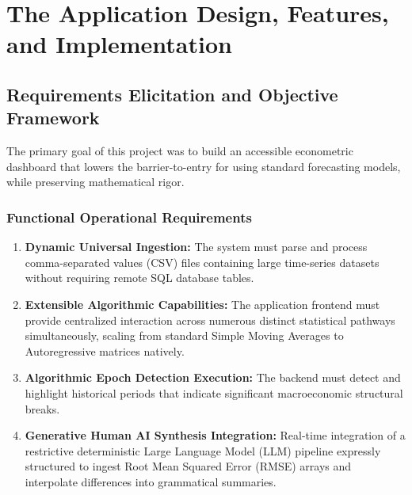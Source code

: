 \chapter{The Application Design, Features, and Implementation}
\label{ch:application_design}

\section{Requirements Elicitation and Objective Framework}
The primary goal of this project was to build an accessible econometric dashboard that lowers the barrier-to-entry for using standard forecasting models, while preserving mathematical rigor. 

\subsection{Functional Operational Requirements}
\begin{enumerate}
    \item \textbf{Dynamic Universal Ingestion:} The system must parse and process comma-separated values (CSV) files containing large time-series datasets without requiring remote SQL database tables.
    \item \textbf{Extensible Algorithmic Capabilities:} The application frontend must provide centralized interaction across numerous distinct statistical pathways simultaneously, scaling from standard Simple Moving Averages to Autoregressive matrices natively.
    \item \textbf{Algorithmic Epoch Detection Execution:} The backend must detect and highlight historical periods that indicate significant macroeconomic structural breaks.
    \item \textbf{Generative Human AI Synthesis Integration:} Real-time integration of a restrictive deterministic Large Language Model (LLM) pipeline expressly structured to ingest Root Mean Squared Error (RMSE) arrays and interpolate differences into grammatical summaries.
\end{enumerate}

